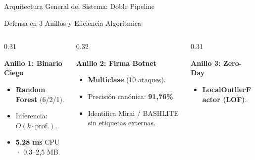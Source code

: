 \documentclass[aspectratio=169, 10pt]{beamer}
\begin{document}
\begin{frame}{Arquitectura General del Sistema: Doble Pipeline}
{
  }%
\end{frame}

\begin{frame}{Defensa en 3 Anillos y Eficiencia Algorítmica}
  \begin{columns}[T]
    \begin{column}{0.31\textwidth}
      \begin{block}{\textbf{Anillo 1: Binario Ciego}}
        \footnotesize
        \begin{itemize}
          \item \textbf{Random Forest} (6/2/1).
          \item Inferencia: $O(k \cdot \text{prof.})$.
          \item \textbf{5,28 ms} CPU · 0,3--2,5 MB.
        \end{itemize}
      \end{block}
    \end{column}
    \begin{column}{0.32\textwidth}
      \begin{block}{\textbf{Anillo 2: Firma Botnet}}
        \footnotesize
        \begin{itemize}
          \item \textbf{Multiclase} (10 ataques).
          \item Precisión canónica: \textbf{91,76\%}.
          \item Identifica Mirai / BASHLITE sin etiquetas externas.
        \end{itemize}
      \end{block}
    \end{column}
    \begin{column}{0.31\textwidth}
      \begin{alertblock}{\textbf{Anillo 3: Zero-Day}}
        \footnotesize
        \begin{itemize}
          \item \textbf{LocalOutlierFactor (LOF)}.

\end{itemize}
\end{alertblock}
\end{column}
\end{columns}
\end{frame}
\end{document}
